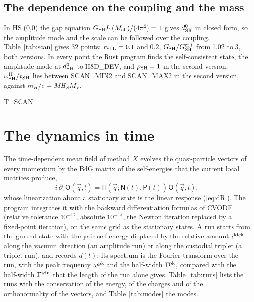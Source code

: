 \documentclass[aps,prd,onecolumn,superscriptaddress,nofootinbib,floatfix,longbibliography]{revtex4-2}
\newcommand{\LL}{{\rm LL}}
\newcommand{\SH}{{\rm SH}}
\begin{document}
\subsection{The dependence on the coupling and the mass}

In HS (0,0) the gap equation $G_\SH I_1(M_{\rm eff})/(4\pi^2)=1$ gives $d^0_\SH$ in closed form, so the amplitude mode and the
scale can be followed over the coupling. Table~\ref{tab:scan} gives 32 points: $m_\LL=0.1$ and $0.2$,
$G_\SH/G^{\rm crit}_\SH$ from 1.02 to 3, both versions. In every point the Rust program finds the self-consistent state, the
amplitude mode at $d^0_\SH$ to {{H8D_DEV}}, and $\rho_\SH=1$ in the second version; $\omega^{\rm H}_\SH/v_\SH$ lies between
{{SCAN_MIN2}} and {{SCAN_MAX2}} in the second version, against $m_H/v={{MH_SM_V}}$.

{{T_SCAN}}

\section{The dynamics in time}
\label{sec:dynamics}

The time-dependent mean field of method $X$ evolves the quasi-particle vectors of every momentum by the BdG matrix of the
self-energies that the current local matrices produce,
\begin{equation}
i\,\partial_t\,\mathsf O(\vec q,t)=\mathsf H(\vec q;\mathsf N(t),\mathsf P(t))\,\mathsf O(\vec q,t),
\label{eq:tdmf}
\end{equation}
whose linearization about a stationary state is the linear response (\ref{eq:dR}). The program integrates it with the
backward differentiation formulas of CVODE~\cite{SUNDIALS2005,SUNDIALS2022} (relative tolerance $10^{-12}$, absolute
$10^{-14}$, the Newton iteration replaced by a fixed-point iteration), on the same grid as the stationary states. A run
starts from the ground state with the pair self-energy displaced by the relative amount $\epsilon^{\rm kick}$ along the
vacuum direction (an amplitude run) or along the custodial triplet (a triplet run), and records $d(t)$; its spectrum is
the Fourier transform over the run, with the peak frequency $\omega^{\rm pk}$ and the half-width $\Gamma^{\rm pk}$, compared
with the half-width $\Gamma^{\rm win}$ that the length of the run alone gives. Table~\ref{tab:runs} lists the runs with the
conservation of the energy, of the charges and of the orthonormality of the vectors, and Table~\ref{tab:modes} the modes.
\end{document}
